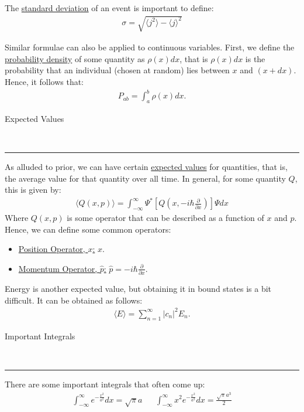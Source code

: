 \documentclass{article}
\newcommand{\header}[1]{\begin{large}\noindent #1\end{large}\\\rule{\textwidth}{0.5pt}}
\newcommand{\gap}{\medskip\\}
\newcommand{\sheader}[1]{\underline{#1:}}
\begin{document}
    The \underline{standard deviation} of an event is important to define:
    \begin{align*}
        \sigma = \sqrt{\langle j^2 \rangle - \langle j \rangle^2}
    \end{align*}

    Similar formulae can also be applied to continuous variables. First, we 
    define the \underline{probability density} of some quantity as $\rho(x) dx$,
    that is $\rho(x)dx$ is the probability that an individual (chosen at random)
    lies between $x$ and $(x + dx)$. Hence, it follows that:
    \begin{align*}
        P_{ab} = \int_a^b \rho(x) dx.
    \end{align*}

    \pagebreak 

    \header{Expected Values}

    As alluded to prior, we can have certain \underline{expected values} for quantities,
    that is, the average value for that quantity over all time. In general, for some quantity $Q$, this is given
    by:
    \begin{align*}
        \langle Q(x, p) \rangle = \int_{-\infty}^{\infty} \Psi^* \left[Q\left(x, -i\hbar \frac{\partial}{\partial x}\right)\right]\Psi dx
    \end{align*}
    Where $Q(x,p)$ is some operator that can be described as a function of $x$ and $p$.
    \gap
    Hence, we can define some common operators:
    \begin{itemize}
        \item \sheader{Position Operator, $x$} $x$.
        \item \sheader{Momentum Operator, $\hat{p}$} $\hat{p} = -i\hbar \frac{\partial}{\partial x}$.
    \end{itemize}
    Energy is another expected value, but obtaining it in bound states is a bit difficult.
    It can be obtained as follows:
    \begin{align*}
        \langle E \rangle = \sum_{n = 1}^\infty |c_n|^2 E_n.
    \end{align*}

    \header{Important Integrals}

    There are some important integrals that often come up:
    \begin{align*}
        \int_{-\infty}^\infty e^{-\frac{x^2}{a^2}}dx = \sqrt{\pi} a && \int_{-\infty}^\infty x^2 e^{-\frac{x^2}{a^2}} dx = \frac{\sqrt{\pi} a^3}{2}
    \end{align*}
\end{document}
